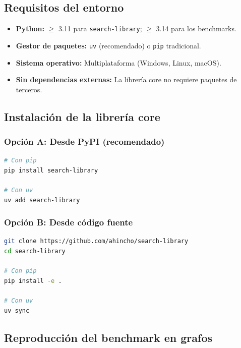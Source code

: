 \subsection{Requisitos del entorno}

\begin{itemize}
    \item \textbf{Python:} $\geq$ 3.11 para \texttt{search-library}; $\geq$ 3.14 para los benchmarks.
    \item \textbf{Gestor de paquetes:} \texttt{uv} (recomendado) o \texttt{pip} tradicional.
    \item \textbf{Sistema operativo:} Multiplataforma (Windows, Linux, macOS).
    \item \textbf{Sin dependencias externas:} La librería core no requiere paquetes de terceros.
\end{itemize}

\subsection{Instalación de la librería core}

\subsubsection{Opción A: Desde PyPI (recomendado)}

\begin{lstlisting}[language=bash, caption={Instalación desde PyPI}, label={lst:install_pypi}]
# Con pip
pip install search-library

# Con uv
uv add search-library
\end{lstlisting}

\subsubsection{Opción B: Desde código fuente}

\begin{lstlisting}[language=bash, caption={Instalación desde fuente}, label={lst:install_source}]
git clone https://github.com/ahincho/search-library
cd search-library

# Con pip
pip install -e .

# Con uv
uv sync
\end{lstlisting}

\subsection{Reproducción del benchmark en grafos}


